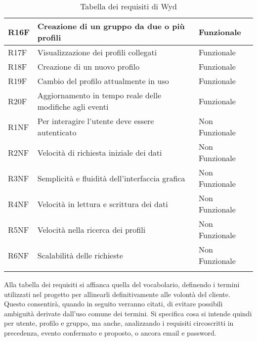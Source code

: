 \begin{longtable} {|P{1.3cm}|P{11.2cm}|P{3cm}|}
    \hline
    R16F        & Creazione di un gruppo da due o più profili                                 & Funzionale     \\
    \hline
    R17F        & Visualizzazione dei profili collegati                                       & Funzionale     \\
    \hline
    R18F        & Creazione di un nuovo profilo                                               & Funzionale     \\
    \hline
    R19F        & Cambio del profilo attualmente in uso                                       & Funzionale     \\
    \hline
    R20F        & Aggiornamento in tempo reale delle modifiche agli eventi                    & Funzionale     \\
    \hline
    R1NF        & Per interagire l'utente deve essere autenticato                             & Non Funzionale \\
    \hline
    R2NF        & Velocità di richiesta iniziale dei dati                                     & Non Funzionale \\
    \hline
    R3NF        & Semplicità e fluidità dell'interfaccia grafica                              & Non Funzionale \\
    \hline
    R4NF        & Velocità in lettura e scrittura dei dati                                    & Non Funzionale \\
    \hline
    R5NF        & Velocità nella ricerca dei profili                                          & Non Funzionale \\
    \hline
    R6NF        & Scalabilità delle richieste                                                 & Non Funzionale \\
    \hline
    \caption{Tabella dei requisiti di Wyd}
\end{longtable}


Alla tabella dei requisiti si affianca quella del vocabolario,
definendo i termini utilizzati nel progetto per allinearli definitivamente alle volontà del cliente.
Questo consentirà, quando in seguito verranno citati, 
di evitare possibili ambiguità derivate dall'uso comune dei termini.
Si specifica cosa si intende quindi per utente, profilo e gruppo, ma anche,
analizzando i requisiti circoscritti in precedenza, 
evento confermato e proposto, o ancora email e password.
\\

